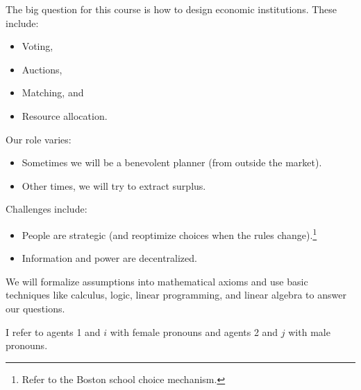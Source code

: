 \vspace{-2\baselineskip}
The big question for this course is how to design economic institutions. These include:
\begin{itemize}
	\item Voting,
	\item Auctions,
	\item Matching, and
	\item Resource allocation.
\end{itemize}

Our role varies:
\begin{itemize}
	\item Sometimes we will be a benevolent planner (from outside the market).
	\item Other times, we will try to extract surplus.
\end{itemize}

Challenges include:
\begin{itemize}
	\item People are strategic (and reoptimize choices when the rules change).\footnote{Refer to the Boston school choice mechanism.}
	\item Information and power are decentralized.
\end{itemize}

We will formalize assumptions into mathematical axioms and use basic techniques like calculus, logic, linear programming, and linear algebra to answer our questions.

I refer to agents 1 and $i$ with female pronouns and agents 2 and $j$ with male pronouns.
